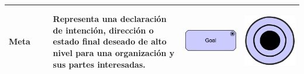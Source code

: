 \begin{longtable}{|p{0.15\linewidth}|p{0.45\linewidth}|p{0.2\linewidth} p{0.2\linewidth}|}
    Meta &
    Representa una declaración de intención, dirección o estado final deseado de alto nivel para una organización y sus partes interesadas. &
\begin{center}
    \includegraphics[width=1\linewidth]{imgs/capa_motivacional/goal1.pdf}
\end{center} &
\begin{center}
    \includegraphics[width=0.5\linewidth]{imgs/capa_motivacional/goal2.pdf}
\end{center}
    \\ \hline


\end{longtable}
